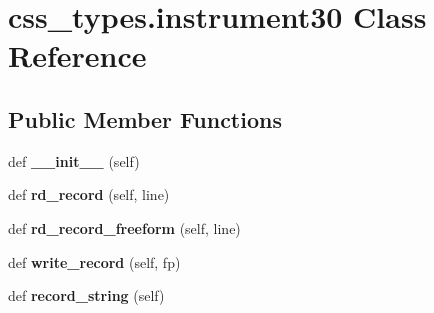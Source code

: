 \hypertarget{classcss__types_1_1instrument30}{}\section{css\+\_\+types.\+instrument30 Class Reference}
\label{classcss__types_1_1instrument30}
\subsection*{Public Member Functions}
\begin{DoxyCompactItemize}
\item 
\hypertarget{classcss__types_1_1instrument30_a96ced7f29680eb97a512e76263c7c5d4}{}def {\bfseries \+\_\+\+\_\+init\+\_\+\+\_\+} (self)\label{classcss__types_1_1instrument30_a96ced7f29680eb97a512e76263c7c5d4}

\item 
\hypertarget{classcss__types_1_1instrument30_a559688e936a71f4a3cf4308e5ca8e913}{}def {\bfseries rd\+\_\+record} (self, line)\label{classcss__types_1_1instrument30_a559688e936a71f4a3cf4308e5ca8e913}

\item 
\hypertarget{classcss__types_1_1instrument30_a6c15a65dd3b945b3747056e961a072a1}{}def {\bfseries rd\+\_\+record\+\_\+freeform} (self, line)\label{classcss__types_1_1instrument30_a6c15a65dd3b945b3747056e961a072a1}

\item 
\hypertarget{classcss__types_1_1instrument30_ab42d634c913766458601a88a98211456}{}def {\bfseries write\+\_\+record} (self, fp)\label{classcss__types_1_1instrument30_ab42d634c913766458601a88a98211456}

\item 
\hypertarget{classcss__types_1_1instrument30_ae8374a74f84c38b65dc00e7367bc0f3f}{}def {\bfseries record\+\_\+string} (self)\label{classcss__types_1_1instrument30_ae8374a74f84c38b65dc00e7367bc0f3f}

\end{DoxyCompactItemize}
